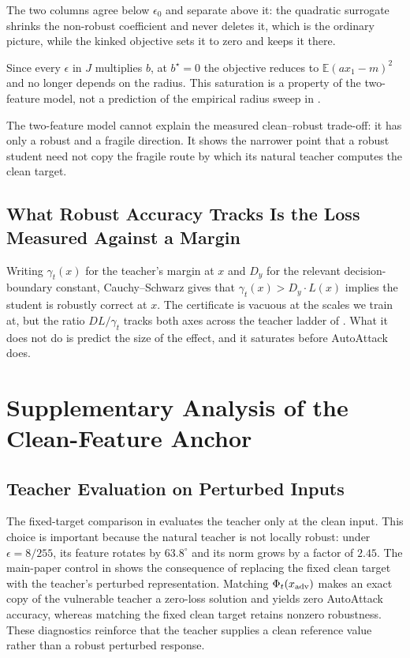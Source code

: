 The two columns agree below $\epsilon_0$ and separate above it: the quadratic surrogate shrinks the
non-robust coefficient and never deletes it, which is the ordinary picture, while the kinked objective
sets it to zero and keeps it there.

Since every $\epsilon$ in $J$ multiplies $b$, at $b^\star=0$ the objective reduces to
$\mathbb{E}(a x_1-m)^2$ and no longer depends on the radius. This saturation is a property of the
two-feature model, not a prediction of the empirical radius sweep in .

The two-feature model cannot explain the measured clean--robust trade-off: it has only a robust and
a fragile direction. It shows the narrower point that a robust student need not copy the fragile
route by which its natural teacher computes the clean target.

\subsection{What Robust Accuracy Tracks Is the Loss Measured Against a Margin}

Writing $\gamma_t(x)$ for the teacher's margin at $x$ and $D_y$ for the relevant decision-boundary
constant, Cauchy--Schwarz gives that $\gamma_t(x) > D_y \cdot L(x)$ implies the student is robustly
correct at $x$. The certificate is vacuous at the scales we train at, but the ratio $D L/\gamma_t$
tracks both axes across the teacher ladder of . What it does not do is predict
the size of the effect, and it saturates before AutoAttack does.

\section{Supplementary Analysis of the Clean-Feature Anchor}
\label{app:anchor_analysis}

\subsection{Teacher Evaluation on Perturbed Inputs}
\label{app:teacher_diagnostics}

The fixed-target comparison in  evaluates the teacher only
at the clean input. This choice is important because the natural teacher is
not locally robust: under \(\epsilon=8/255\), its feature rotates by
\(63.8^\circ\) and its norm grows by a factor of \(2.45\). The main-paper
control in  shows the consequence of replacing the
fixed clean target with the teacher's perturbed representation. Matching
\(\Phi_t(x_{\rm adv})\) makes an exact copy of the vulnerable teacher a
zero-loss solution and yields zero AutoAttack accuracy, whereas matching the
fixed clean target retains nonzero robustness. These diagnostics reinforce
that the teacher supplies a clean reference value rather than a robust
perturbed response.

